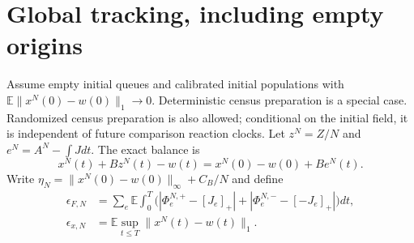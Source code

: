 \documentclass[11pt,oneside,openany]{book}
\theoremstyle{definition}
\theoremstyle{remark}\newtheorem{remark}[theorem]{Remark}
\begin{document}
\section{Global tracking, including empty origins}
Assume empty initial queues and calibrated initial populations with
$\mathbb E\|x^N(0)-w(0)\|_1\to0$. Deterministic census preparation is a special case. Randomized census preparation is also allowed; conditional on the initial field, it is independent of future comparison reaction clocks. Let $z^N=Z/N$ and
$e^N=A^N-\int Jdt$. The exact balance is
\begin{equation}
 x^N(t)+Bz^N(t)-w(t)=x^N(0)-w(0)+Be^N(t).
 \label{kin:balance}
\end{equation}
Write $\eta_N=\|x^N(0)-w(0)\|_\infty+C_B/N$ and define
\begin{align}
 \epsilon_{F,N}&=\sum_e\mathbb E\int_0^T
 \bigl(|\Phi_e^{N,+}-[J_e]_+|+
 |\Phi_e^{N,-}-[-J_e]_+|\bigr)dt,\label{kin:epsF}\\
 \epsilon_{x,N}&=\mathbb E\sup_{t\le T}\|x^N(t)-w(t)\|_1.
 \label{kin:epsx}
\end{align}
\end{document}
